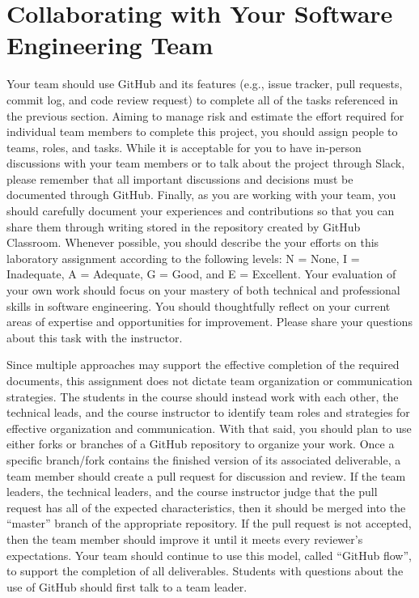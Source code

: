 \documentclass[11pt]{article}
\begin{document}
\section*{Collaborating with Your Software Engineering Team}

Your team should use GitHub and its features (e.g., issue tracker, pull
requests, commit log, and code review request) to complete all of the tasks
referenced in the previous section.
%
Aiming to manage risk and estimate the effort required for individual team
members to complete this project, you should assign people to teams, roles, and
tasks. While it is acceptable for you to have in-person discussions with your
team members or to talk about the project through Slack, please remember that
all important discussions and decisions must be documented through GitHub.
Finally, as you are working with your team, you should carefully document your
experiences and contributions so that you can share them through writing stored
in the repository created by GitHub Classroom.
%
Whenever possible, you should describe the your efforts on this laboratory
assignment according to the following levels: N = None, I = Inadequate, A =
Adequate, G = Good, and E = Excellent. Your evaluation of your own work should
focus on your mastery of both technical and professional skills in software
engineering. You should thoughtfully reflect on your current areas of expertise
and opportunities for improvement. Please share your questions about this task
with the instructor.

Since multiple approaches may support the effective completion of the required
documents, this assignment does not dictate team organization or communication
strategies. The students in the course should instead work with each other, the
technical leads, and the course instructor to identify team roles and strategies
for effective organization and communication. With that said, you should plan to
use either forks or branches of a GitHub repository to organize your work.
%
Once a specific branch/fork contains the finished version of its associated
deliverable, a team member should create a pull request for discussion and
review. If the team leaders, the technical leaders, and the course instructor
judge that the pull request has all of the expected characteristics, then it
should be merged into the ``master'' branch of the appropriate repository. If
the pull request is not accepted, then the team member should improve it until
it meets every reviewer's expectations. Your team should continue to use this
model, called ``GitHub flow'', to support the completion of all deliverables.
%
Students with questions about the use of GitHub should first talk to a team
leader.
\end{document}
